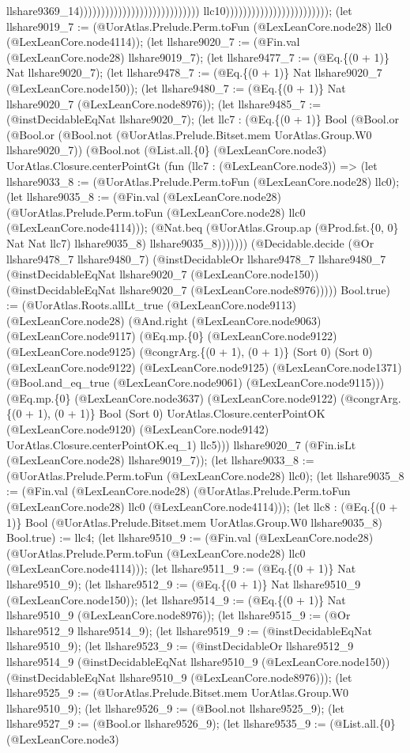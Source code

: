 \documentclass[11pt]{article}
\begin{document}
llshare9369\_14)))))))))))))))))))))))))))) llc10)))))))))))))))))))))))); (let llshare9019\_7 := (@UorAtlas.Prelude.Perm.toFun (@LexLeanCore.node28) llc0 (@LexLeanCore.node4114)); (let llshare9020\_7 := (@Fin.val (@LexLeanCore.node28) llshare9019\_7); (let llshare9477\_7 := (@Eq.\{(0 + 1)\} Nat llshare9020\_7); (let llshare9478\_7 := (@Eq.\{(0 + 1)\} Nat llshare9020\_7 (@LexLeanCore.node150)); (let llshare9480\_7 := (@Eq.\{(0 + 1)\} Nat llshare9020\_7 (@LexLeanCore.node8976)); (let llshare9485\_7 := (@instDecidableEqNat llshare9020\_7); (let llc7 : (@Eq.\{(0 + 1)\} Bool (@Bool.or (@Bool.or (@Bool.not (@UorAtlas.Prelude.Bitset.mem UorAtlas.Group.W0 llshare9020\_7)) (@Bool.not (@List.all.\{0\} (@LexLeanCore.node3) UorAtlas.Closure.centerPointGt (fun (llc7 : (@LexLeanCore.node3)) => (let llshare9033\_8 := (@UorAtlas.Prelude.Perm.toFun (@LexLeanCore.node28) llc0); (let llshare9035\_8 := (@Fin.val (@LexLeanCore.node28) (@UorAtlas.Prelude.Perm.toFun (@LexLeanCore.node28) llc0 (@LexLeanCore.node4114))); (@Nat.beq (@UorAtlas.Group.ap (@Prod.fst.\{0, 0\} Nat Nat llc7) llshare9035\_8) llshare9035\_8))))))) (@Decidable.decide (@Or llshare9478\_7 llshare9480\_7) (@instDecidableOr llshare9478\_7 llshare9480\_7 (@instDecidableEqNat llshare9020\_7 (@LexLeanCore.node150)) (@instDecidableEqNat llshare9020\_7 (@LexLeanCore.node8976))))) Bool.true) := (@UorAtlas.Roots.allLt\_true (@LexLeanCore.node9113) (@LexLeanCore.node28) (@And.right (@LexLeanCore.node9063) (@LexLeanCore.node9117) (@Eq.mp.\{0\} (@LexLeanCore.node9122) (@LexLeanCore.node9125) (@congrArg.\{(0 + 1), (0 + 1)\} (Sort 0) (Sort 0) (@LexLeanCore.node9122) (@LexLeanCore.node9125) (@LexLeanCore.node1371) (@Bool.and\_eq\_true (@LexLeanCore.node9061) (@LexLeanCore.node9115))) (@Eq.mp.\{0\} (@LexLeanCore.node3637) (@LexLeanCore.node9122) (@congrArg.\{(0 + 1), (0 + 1)\} Bool (Sort 0) UorAtlas.Closure.centerPointOK (@LexLeanCore.node9120) (@LexLeanCore.node9142) UorAtlas.Closure.centerPointOK.eq\_1) llc5))) llshare9020\_7 (@Fin.isLt (@LexLeanCore.node28) llshare9019\_7)); (let llshare9033\_8 := (@UorAtlas.Prelude.Perm.toFun (@LexLeanCore.node28) llc0); (let llshare9035\_8 := (@Fin.val (@LexLeanCore.node28) (@UorAtlas.Prelude.Perm.toFun (@LexLeanCore.node28) llc0 (@LexLeanCore.node4114))); (let llc8 : (@Eq.\{(0 + 1)\} Bool (@UorAtlas.Prelude.Bitset.mem UorAtlas.Group.W0 llshare9035\_8) Bool.true) := llc4; (let llshare9510\_9 := (@Fin.val (@LexLeanCore.node28) (@UorAtlas.Prelude.Perm.toFun (@LexLeanCore.node28) llc0 (@LexLeanCore.node4114))); (let llshare9511\_9 := (@Eq.\{(0 + 1)\} Nat llshare9510\_9); (let llshare9512\_9 := (@Eq.\{(0 + 1)\} Nat llshare9510\_9 (@LexLeanCore.node150)); (let llshare9514\_9 := (@Eq.\{(0 + 1)\} Nat llshare9510\_9 (@LexLeanCore.node8976)); (let llshare9515\_9 := (@Or llshare9512\_9 llshare9514\_9); (let llshare9519\_9 := (@instDecidableEqNat llshare9510\_9); (let llshare9523\_9 := (@instDecidableOr llshare9512\_9 llshare9514\_9 (@instDecidableEqNat llshare9510\_9 (@LexLeanCore.node150)) (@instDecidableEqNat llshare9510\_9 (@LexLeanCore.node8976))); (let llshare9525\_9 := (@UorAtlas.Prelude.Bitset.mem UorAtlas.Group.W0 llshare9510\_9); (let llshare9526\_9 := (@Bool.not llshare9525\_9); (let llshare9527\_9 := (@Bool.or llshare9526\_9); (let llshare9535\_9 := (@List.all.\{0\} (@LexLeanCore.node3) 
\end{document}
